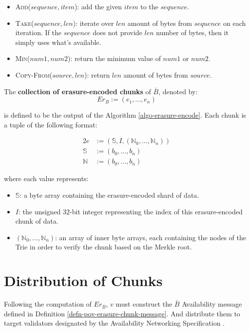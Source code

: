 \begin{itemize}
  \item \textsc{Add($sequence, item$)}: add the given $item$ to the $sequence$.
  \item \textsc{Take($sequence, len$)}: iterate over $len$ amount of bytes from
  $sequence$ on each iteration. If the $sequence$ does not provide $len$ number
  of bytes, then it simply uses what's available.
  \item \textsc{Min($num1, num2$)}: return the minimum value of $num1$ or
  $num2$.
  \item \textsc{Copy-From($source, len$)}: return $len$ amount of bytes from
  $source$.
\end{itemize}

\begin{definition}
  \label{defn-erasure-coded-chunks}
  The {\bf collection of erasure-encoded chunks} of $\bar{B}$, denoted by:
  \[
   Er_B := (e_1,...,e_n)
  \]

  is defined to be the output of the Algorithm \ref{algo-erasure-encode}.
  Each chunk is a tuple of the following format:

  \begin{alignat*}{2}
    e &:= (\mathbb{S}, I, (\mathbb{N}_0,...,\mathbb{N}_n)) \\
    \mathbb{S} &:= (b_0,...,b_n) \\
    \mathbb{N} &:= (b_0,...,b_n)
  \end{alignat*}

  where each value represents:
  \begin{itemize}
    \item $\mathbb{S}$: a byte array containing the erasure-encoded shard of
    data.
    \item $I$: the unsigned 32-bit integer representing the index of this
    erasure-encoded chunk of data.
    \item $(\mathbb{N}_0,...,\mathbb{N}_n)$: an array of inner byte arrays, each
    containing the nodes of the Trie in order to verify the chunk based on the
    Merkle root.
  \end{itemize}
\end{definition}

\section{Distribution of Chunks}\label{sect-distribute-chunks} Following the
computation of $Er_B$, $v$ must construct the $\bar{B}$ Availability message
defined in Definition \ref{defn-pov-erasure-chunk-message}. And distribute them
to target validators designated by the Availability Networking Specification
\cite{??}.

